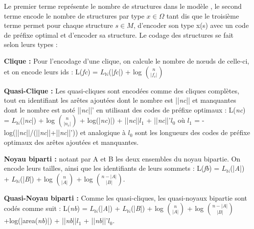 Le premier terme représente le nombre de structures dans le modèle  %
, le second terme encode le nombre de structures par type $x \in \Omega$ tant dis que le troisième terme permet  pour chaque structure $s \in \textit{M}$, d'encoder son type x(s) avec un code de préfixe optimal et d'encoder sa structure. Le codage des structures se fait selon leurs types :

\textbf{Clique :} Pour l'encodage d'une clique, on calcule le nombre de nœuds de celle-ci, et on encode leurs ids :
L(\textit{fc}) = $L_{\mathbb{N}}$(|\textit{fc}|) + log ${n}\choose{|f_{c}|}$

\textbf{Quasi-Clique :} Les quasi-cliques sont encodées comme des cliques complètes, tout en identifiant les arêtes ajoutées dont le nombre est ||\textit{nc}|| et manquantes dont le nombre est noté ||\textit{nc}||' en utilisant des codes de préfixe optimaux : 
L(\textit{nc}) = $L_{\mathbb{N}}$(|\textit{nc}|) + log ${n}\choose{|n_{c}|}$ + log(|\textit{nc})|) + ||\textit{nc}||\textit{$l_{1}$} +  ||\textit{nc}||'\textit{$l_{0}$}
où \textit{$l_{1}$} = - log(||\textit{nc}||/(||\textit{nc}||+||\textit{nc}||')) et analogique à \textit{$l_{0}$} sont les longueurs des codes de préfixe optimaux des arêtes  ajoutées et manquantes.

\textbf{Noyau biparti :} notant par A et B les deux ensembles du noyau bipartie. On encode leurs tailles, ainsi que les identifiants de leurs sommets : 
L(\textit{fb}) = $L_{\mathbb{N}}$(|\textit{A}|) + $L_{\mathbb{N}}$(|\textit{B}|) + log ${n}\choose{|A|}$ + log ${n-|A|}\choose{|B|}$.

\textbf{Quasi-Noyau biparti :} Comme les quasi-cliques, les quasi-noyaux bipartie sont codés comme suit :
L(\textit{nb}) = $L_{\mathbb{N}}$(|\textit{A}|) + $L_{\mathbb{N}}$(|\textit{B}|) + log ${n}\choose{|A|}$  + log ${n-|A|}\choose{|B|}$+log(|area(\textit{nb})|) + ||\textit{nb}||\textit{$l_{1}$} + ||\textit{nb}||'\textit{$l_{0}$}.

